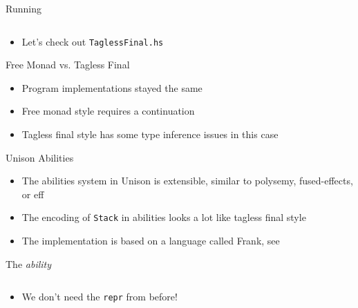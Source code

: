 \documentclass[hyperref={pdfpagelabels=false},12pt]{beamer}
\newcommand{\code}[2]{\texttt{#2}}
\newcommand{\haskell}[1]{\code{haskell}{#1}}
\newcommand{\bash}[1]{\code{bash}{#1}}
\newcommand{\unnamedUrl}[1]{\href{#1}{\color{blue}{#1}}}
\newcommand{\pygmentLines}[5]{\inputminted[bgcolor=lightgray,linenos,fontsize=#1,firstline=#2,lastline=#3,autogobble]{#4}{#5}}
\begin{document}
\begin{frame}{Running}
  \pygmentLines{\scriptsize}{51}{57}{haskell}{code/TaglessFinal.hs}
  \begin{itemize}
    \item Let's check out \bash{TaglessFinal.hs}
  \end{itemize}
\end{frame}

\begin{frame}{Free Monad vs. Tagless Final}
  \begin{itemize}
    \item Program implementations stayed the same
    \item Free monad style requires a continuation
    \item Tagless final style has some type inference issues in this case
  \end{itemize}
\end{frame}

\begin{frame}{Unison Abilities}
  \begin{itemize}
    \item The abilities system in Unison is extensible, similar to polysemy,
      fused-effects, or eff
    \item The encoding of \haskell{Stack} in abilities looks a lot like tagless
      final style
    \item The implementation is based on a language called Frank, see
      \unnamedUrl{https://arxiv.org/pdf/1611.09259.pdf}
  \end{itemize}
\end{frame}

\begin{frame}{The \textit{ability}}
  \pygmentLines{\scriptsize}{42}{45}{haskell}{code/ability.u}
  \begin{itemize}
    \item We don't need the \haskell{repr} from before!
  \end{itemize}
\end{frame}
\end{document}

